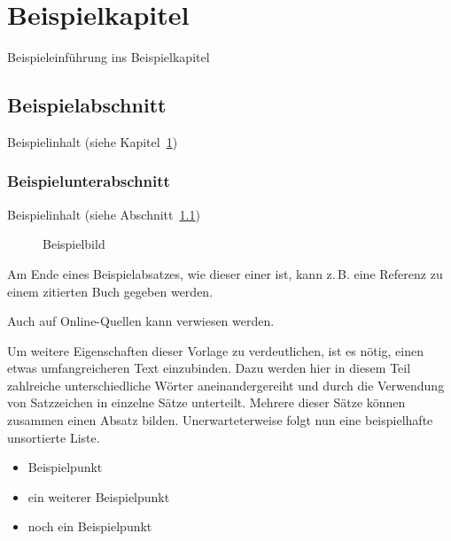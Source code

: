 \documentclass[
	paper=a4, %
	fontsize=11pt, %
	parskip=half, %
	DIV=15, %
	BCOR=22.5mm, %
	headsepline, %
	numbers=noenddot, %
	toc=bibliography %
]{scrbook} %
\newcommand{\zb}{z.\,B.} %
\begin{document}
\cleardoublepage
\tableofcontents


\mainmatter


\chapter{Beispielkapitel}
\label{chap:beispielkapitel}

Beispieleinführung ins Beispielkapitel

\section{Beispielabschnitt}
\label{sec:beispielabschnitt}

Beispielinhalt (siehe Kapitel~\ref{chap:beispielkapitel})

\subsection{Beispielunterabschnitt}
\label{subsec:beispielunterabschnitt}

Beispielinhalt (siehe Abschnitt~\ref{sec:beispielabschnitt})

\begin{figure}[H] %
\centering{}
\caption{Beispielbild}
\label{fig:beispielbild}
\end{figure}

Am Ende eines Beispielabsatzes, wie dieser einer ist, kann \zb{} eine Referenz zu einem zitierten Buch gegeben werden. \parencite[][]{beispiel:2015}

Auch auf Online-Quellen kann verwiesen werden. \parencite[][]{obeispiel}

Um weitere Eigenschaften dieser Vorlage zu verdeutlichen, ist es nötig, einen etwas umfangreicheren Text einzubinden. Dazu werden hier in diesem Teil zahlreiche unterschiedliche Wörter aneinandergereiht und durch die Verwendung von Satzzeichen in einzelne Sätze unterteilt. Mehrere dieser Sätze können zusammen einen Absatz bilden. Unerwarteterweise folgt nun eine beispielhafte unsortierte Liste.

\begin{itemize} \itemsep0pt \parskip0pt
\item Beispielpunkt
\item ein weiterer Beispielpunkt
\item noch ein Beispielpunkt
\end{itemize}
\end{document}
